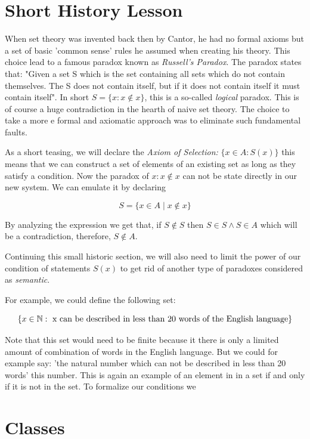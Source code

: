 \QED

\section{Short History Lesson}

When set theory was invented back then by Cantor, he had no formal axioms but a set of basic 'common sense' rules he assumed when
creating his theory. This choice lead to a famous paradox known as \emph{Russell's Paradox}. The paradox states that: "Given a set S which is
the set containing all sets which do not contain themselves. The S does not contain itself, but if it does not contain itself it must contain itself".
In short \(S = \{x: x \notin x\}\), this is a so-called \emph{logical} paradox. This is of course a huge contradiction in the hearth of naive set theory. The choice to take a more e
formal and axiomatic approach was to eliminate such fundamental faults.

As a short teasing, we will declare the \emph{Axiom of Selection:} \(\{x \in A: S(x)\}\) this means that we can construct a set of elements
of an existing set as long as they satisfy a condition. Now the paradox of \(x: x \notin x\) can not be state directly in our new system. We can emulate it by
declaring

\[
	S = \{x \in A \mid x \notin x\}
\]

By analyzing the expression we get that, if \(S \notin S\) then \(S \in S \land S \in A\) which will be a contradiction,
therefore, \(S \notin A\).

Continuing this small historic section, we will also need to limit the power of our condition of statements \(S(x)\) to get rid of another type
of paradoxes considered as \emph{semantic}.

For example, we could define the following set:

\[
	\{x \in \mathbb{N} : \text{ x can be described in less than 20 words of the English language}\}
\]

Note that this set would need to be finite because it there is only a limited amount of combination of words in the English language. But we could
for example say: 'the natural number which can not be described in less than 20 words' this number. This is again an example of an element in in
a set if and only if it is not in the set. To formalize our conditions we

\section{Classes}

